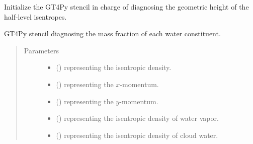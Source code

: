 \documentclass[letterpaper,10pt,english]{sphinxmanual}
\begin{document}
\begin{fulllineitems}

\begin{fulllineitems}
\label{\detokenize{api:tasmania.dycore.diagnostic_isentropic.DiagnosticIsentropic._stencil_diagnosing_height_initialize}}
Initialize the GT4Py stencil in charge of diagnosing the geometric height of the half-level isentropes.

\end{fulllineitems}


\begin{fulllineitems}
\label{\detokenize{api:tasmania.dycore.diagnostic_isentropic.DiagnosticIsentropic._stencil_diagnosing_mass_fraction_of_water_constituents_in_air_defs}}
GT4Py stencil diagnosing the mass fraction of each water constituent.
\begin{quote}\begin{description}
\item[{Parameters}] \leavevmode\begin{itemize}
\item {} 
 () \textendash{}  representing the isentropic density.

\item {} 
 () \textendash{}  representing the \(x\)-momentum.

\item {} 
 () \textendash{}  representing the \(y\)-momentum.

\item {} 
 () \textendash{}  representing the isentropic density of water vapor.

\item {} 
 () \textendash{}  representing the isentropic density of cloud water.


\end{itemize}
\end{description}
\end{quote}
\end{fulllineitems}
\end{fulllineitems}
\end{document}
